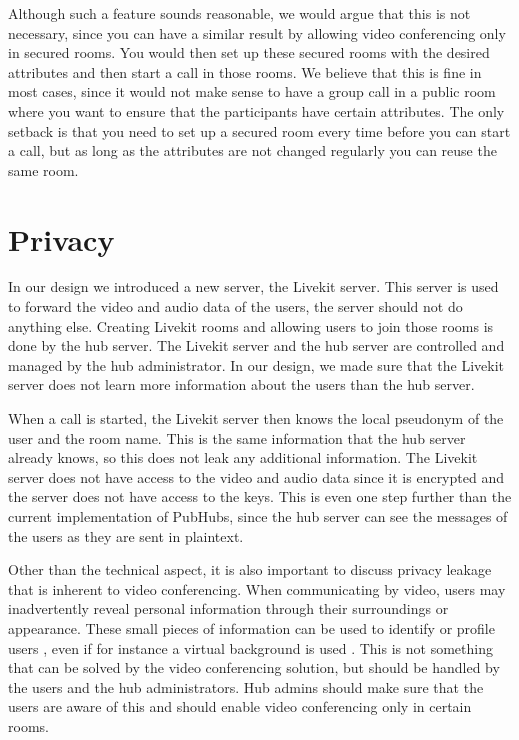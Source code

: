 \documentclass{report}
\begin{document}
Although such a feature sounds reasonable, we would argue that this is not necessary, since you can have a similar
result by allowing video conferencing only in secured rooms. You would then set up these secured rooms with the
desired attributes and then start a call in those rooms. We believe that this is fine in most cases, since it would
not make sense to have a group call in a public room where you want to ensure that the participants have certain attributes.
The only setback is that you need to set up a secured room every time before you can start a call, but as long as the
attributes are not changed regularly you can reuse the same room.

\section{Privacy}
In our design we introduced a new server, the Livekit server. This server is used to forward the video and audio data
of the users, the server should not do anything else. Creating Livekit rooms and allowing users to join
those rooms is done by the hub server. The Livekit server and the hub server are controlled and managed by the hub
administrator. In our design, we made sure that the Livekit server does not learn more information about the users
than the hub server.

When a call is started, the Livekit server then knows the local pseudonym of the user and the room name. This is the
same information that the hub server already knows, so this does not leak any additional information. The Livekit server
does not have access to the video and audio data since it is encrypted and the server does not have access to the keys.
This is even one step further than the current implementation of PubHubs, since the hub server can see the messages of
the users as they are sent in plaintext.

Other than the technical aspect, it is also important to discuss privacy leakage that is inherent to video conferencing.
When communicating by video, users may inadvertently reveal personal information through their surroundings or
appearance. These small pieces of information can be used to identify or profile users \cite{kagan_zooming_2024},
even if for instance a virtual background is used \cite{hilgefort_spying_2021}. This is not something that can be
solved by the video conferencing solution, but should be handled by the users and the hub administrators. Hub admins
should make sure that the users are aware of this and should enable video conferencing only in certain rooms.
\end{document}

